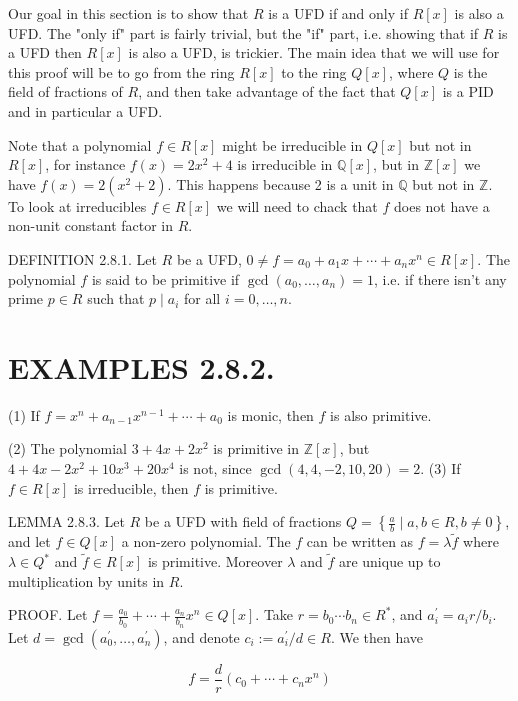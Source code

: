 Our goal in this section is to show that $R$ is a UFD if and only if $R[x]$ is also a UFD. The "only if" part is fairly trivial, but the "if" part, i.e. showing that if $R$ is a UFD then $R[x]$ is also a UFD, is trickier. The main idea that we will use for this proof will be to go from the ring $R[x]$ to the ring $Q[x]$, where $Q$ is the field of fractions of $R$, and then take advantage of the fact that $Q[x]$ is a PID and in particular a UFD.

Note that a polynomial $f \in R[x]$ might be irreducible in $Q[x]$ but not in $R[x]$, for instance $f(x)=2 x^{2}+4$ is irreducible in $\mathbb{Q}[x]$, but in $\mathbb{Z}[x]$ we have $f(x)=2\left(x^{2}+2\right)$. This happens because 2 is a unit in $\mathbb{Q}$ but not in $\mathbb{Z}$. To look at irreducibles $f \in R[x]$ we will need to chack that $f$ does not have a non-unit constant factor in $R$.

DEFINITION 2.8.1. Let $R$ be a UFD, $0 \neq f=a_{0}+a_{1} x+\cdots+a_{n} x^{n} \in R[x]$. The polynomial $f$ is said to be primitive if $\operatorname{gcd}\left(a_{0}, \ldots, a_{n}\right)=1$, i.e. if there isn't any prime $p \in R$ such that $p \mid a_{i}$ for all $i=0, \ldots, n$.

\section{EXAMPLES 2.8.2.}

(1) If $f=x^{n}+a_{n-1} x^{n-1}+\cdots+a_{0}$ is monic, then $f$ is also primitive.

(2) The polynomial $3+4 x+2 x^{2}$ is primitive in $\mathbb{Z}[x]$, but $4+4 x-2 x^{2}+10 x^{3}+20 x^{4}$ is not, since $\operatorname{gcd}(4,4,-2,10,20)=2$. (3) If $f \in R[x]$ is irreducible, then $f$ is primitive.

LEMMA 2.8.3. Let $R$ be a UFD with field of fractions $Q=\left\{\frac{a}{b} \mid a, b \in R, b \neq 0\right\}$, and let $f \in Q[x]$ a non-zero polynomial. The $f$ can be written as $f=\lambda \tilde{f}$ where $\lambda \in Q^{*}$ and $\tilde{f} \in R[x]$ is primitive. Moreover $\lambda$ and $\tilde{f}$ are unique up to multiplication by units in $R$.

PROOF. Let $f=\frac{a_{0}}{b_{0}}+\cdots+\frac{a_{n}}{b_{n}} x^{n} \in Q[x]$. Take $r=b_{0} \cdots b_{n} \in R^{*}$, and $a_{i}^{\prime}=a_{i} r / b_{i}$. Let $d=\operatorname{gcd}\left(a_{0}^{\prime}, \ldots, a_{n}^{\prime}\right)$, and denote $c_{i}:=a_{i}^{\prime} / d \in R$. We then have

$$
f=\frac{d}{r}\left(c_{0}+\cdots+c_{n} x^{n}\right)
$$

